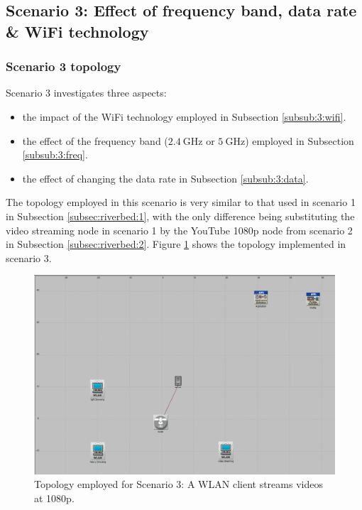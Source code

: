 \subsection{Scenario 3: Effect of frequency band, data rate \& WiFi technology} \label{subsec:riverbed:3}
\subsubsection{Scenario 3 topology}
Scenario 3 investigates three aspects: \begin{itemize}
		\item the impact of the \gls{WiFi} technology employed in Subsection \ref{subsub:3:wifi}.
	\item the effect of the frequency band ($2.4~\mathrm{GHz}$ or $5~\mathrm{GHz}$) employed in Subsection \ref{subsub:3:freq}.
	\item the effect of changing the data rate in Subsection \ref{subsub:3:data}.

\end{itemize}

The topology employed in this scenario is very similar to that used in scenario 1 in Subsection \ref{subsec:riverbed:1}, with the only difference being substituting the video streaming node in scenario 1 by the YouTube 1080p node from scenario 2 in Subsection \ref{subsec:riverbed:2}. Figure \ref{fig:3:topo} shows the topology implemented in scenario 3.

\begin{figure}[H]
	\centering
	\includegraphics[scale=0.3]{Figures/amantianrenamed/Scenario3Topology.png}
	\caption[Topology employed for Scenario 3]{Topology employed for Scenario 3: A \gls{WLAN} client streams videos at 1080p.}
	\label{fig:3:topo}
\end{figure}

